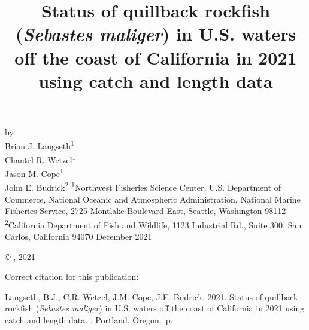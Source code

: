 \documentclass[11pt,
  english,
  letterpaper,
]{article}
\date{}
\newcommand{\trTitle}{Status of quillback rockfish (\emph{Sebastes maliger}) in U.S. waters off the coast of California in 2021 using catch and length data}
\newcommand{\trYear}{2021}
\newcommand{\trMonth}{December}
\newcommand{\trAuthsBack}{Langseth, B.J., C.R. Wetzel, J.M. Cope, J.E. Budrick}
\newcommand{\trCitation}{
\begin{hangparas}{1em}{1}
\trAuthsBack{}. \trYear{}. \trTitle{}. \glsentrylong{pfmc}, Portland, Oregon. \pageref{LastPage}{}\,p.
\end{hangparas}}
\begin{document}

\renewcommand*{\thefootnote}{\fnsymbol{footnote}}

\small
\thispagestyle{empty}
\noindent
\begin{center}
\title{Status of quillback rockfish (\emph{Sebastes maliger}) in U.S. waters off the coast of California in 2021 using catch and length data}
\vspace{1.5cm}
{\Large\textbf{}}
\vfill
by\\
Brian J. Langseth\textsuperscript{1}\\
Chantel R. Wetzel\textsuperscript{1}\\
Jason M. Cope\textsuperscript{1}\\
John E. Budrick\textsuperscript{2}\vfill
\textsuperscript{1}Northwest Fisheries Science Center, U.S. Department of Commerce, National Oceanic and Atmospheric Administration, National Marine Fisheries Service, 2725 Montlake Boulevard East, Seattle, Washington 98112\\
\textsuperscript{2}California Department of Fish and Wildlife, 1123 Industrial Rd., Suite 300, San Carlos, California 94070\vfill
\trMonth{} \trYear{}
\end{center}
\clearpage

\thispagestyle{empty}
\vspace*{\fill}
\begin{center}
\copyright{} , \trYear{}\\
\end{center}
\par
\bigskip
\noindent
Correct citation for this publication:
\bigskip
\par
\trCitation{}
\clearpage


\tableofcontents\clearpage
\label{TRlastRoman}
\clearpage

\newpage
\thispagestyle{empty} %

\pagestyle{plain}  %
\renewcommand*{\thefootnote}{\arabic{footnote}}  %
\setcounter{footnote}{0}  %
\renewcommand{\headrulewidth}{0.5pt}
\renewcommand{\footrulewidth}{0.5pt}
\end{document}

